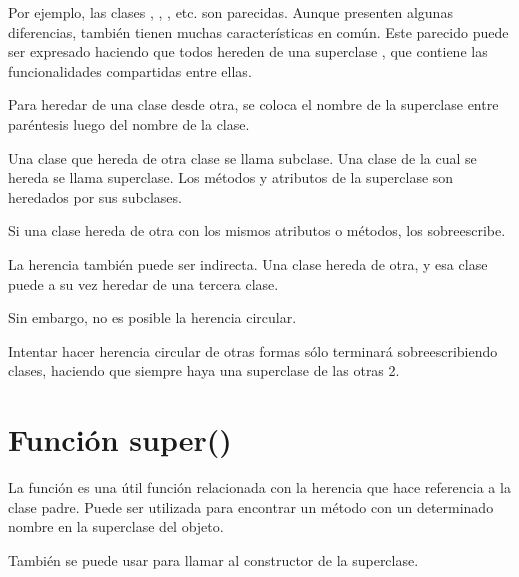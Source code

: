 Por ejemplo, las clases , , , etc. son parecidas.
Aunque presenten algunas diferencias, también tienen muchas características en común.
Este parecido puede ser expresado haciendo que todos hereden de una superclase , que contiene las funcionalidades compartidas entre ellas.
\medskip

Para heredar de una clase desde otra, se coloca el nombre de la superclase entre paréntesis luego del nombre de la clase.


Una clase que hereda de otra clase se llama subclase.
Una clase de la cual se hereda se llama superclase.
Los métodos y atributos de la superclase son heredados por sus subclases.
\medskip

Si una clase hereda de otra con los mismos atributos o métodos, los sobreescribe.


La herencia también puede ser indirecta.
Una clase hereda de otra, y esa clase puede a su vez heredar de una tercera clase.


Sin embargo, no es posible la herencia circular.


Intentar hacer herencia circular de otras formas sólo terminará sobreescribiendo clases, haciendo que siempre haya una superclase de las otras 2.

\section{Función super()}

La función  es una útil función relacionada con la herencia que hace referencia a la clase padre.
Puede ser utilizada para encontrar un método con un determinado nombre en la superclase del objeto.


También se puede usar para llamar al constructor de la superclase.


